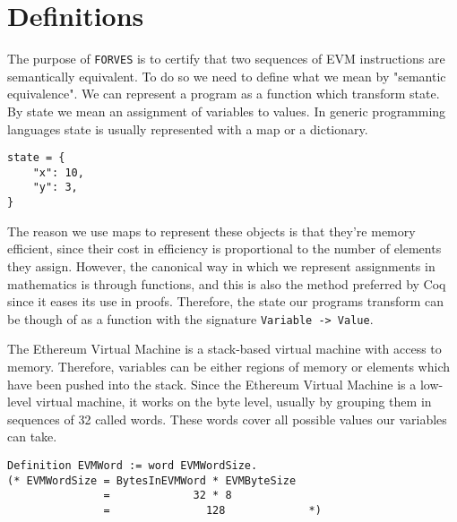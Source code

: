 \chapter{Definitions}
\label{cap:definitions}



The purpose of \texttt{FORVES} is to certify that two sequences of EVM instructions are semantically
equivalent. To do so we need to define what we mean by "semantic equivalence". We can represent a
program as a function which transform state. By state we mean an assignment of variables to values.
In generic programming languages state is usually represented with a map or a dictionary.

\begin{verbatim}
state = {
    "x": 10,
    "y": 3,
}
\end{verbatim}

The reason we use maps to represent these objects is that they're memory efficient, since their 
cost in efficiency is proportional to the number of elements they assign. However, the canonical 
way in which we represent assignments in mathematics is through functions, and this is also the 
method preferred by Coq since it eases its use in proofs. Therefore, the state our programs 
transform can be though of as a function with the signature \texttt{Variable -> Value}.

The Ethereum Virtual Machine is a stack-based virtual machine with access to memory. Therefore,
variables can be either regions of memory or elements which have been pushed into the stack. Since
the Ethereum Virtual Machine is a low-level virtual machine, it works on the byte level, usually
by grouping them in sequences of 32 called words. These words cover all possible values our 
variables can take.

\begin{verbatim}
Definition EVMWord := word EVMWordSize. 
(* EVMWordSize = BytesInEVMWord * EVMByteSize
               =             32 * 8
               =               128             *)
\end{verbatim}

